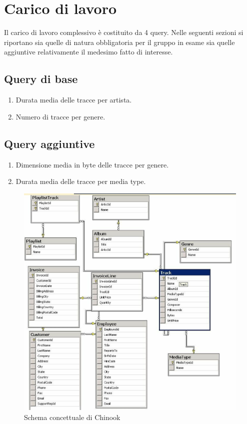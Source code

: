 \documentclass[12pt,a4paper,openright,oneside]{report}
\begin{document}
	\section{Carico di lavoro}
	Il carico di lavoro complessivo è costituito da 4 query. Nelle seguenti sezioni si
	riportano sia quelle di natura obbligatoria per il gruppo in esame sia quelle aggiuntive
	relativamente il medesimo fatto di interesse.
	\subsection{Query di base}
	\begin{enumerate}
		\item Durata media delle tracce per artista.
		\item Numero di tracce per genere.
	\end{enumerate}
	\subsection{Query aggiuntive}
	\begin{enumerate}
		\item Dimensione media in byte delle tracce per genere.
		\item Durata media delle tracce per media type.
	\end{enumerate}
	\begin{figure}[!htb]
	\centering
	\includegraphics[scale=0.35]{eps/chinook_er.eps}
	\caption{Schema concettuale di Chinook}
	\label{fig:chinook_er}
	\end{figure}
	
\end{document}
